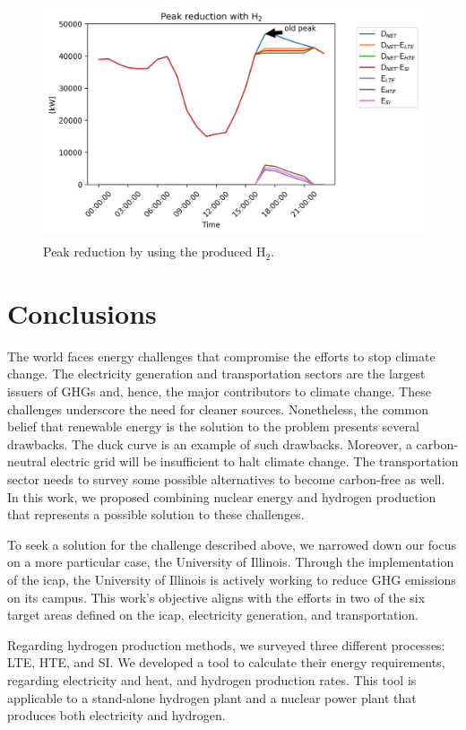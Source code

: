 \begin{figure}[htbp!]
    \centering
	\includegraphics[height=7cm]{figures-hydro/uiuc-hydro3}
	\hfill
	\caption{Peak reduction by using the produced H$_2$.}
	\label{fig:uiuc-duck3}
\end{figure}

\section{Conclusions}

The world faces energy challenges that compromise the efforts to stop climate change.
The electricity generation and transportation sectors are the largest issuers of \glspl{GHG} and, hence, the major contributors to climate change.
These challenges underscore the need for cleaner sources.
Nonetheless, the common belief that renewable energy is the solution to the problem presents several drawbacks.
The duck curve is an example of such drawbacks.
Moreover, a carbon-neutral electric grid will be insufficient to halt climate change.
The transportation sector needs to survey some possible alternatives to become carbon-free as well.
In this work, we proposed combining nuclear energy and hydrogen production that represents a possible solution to these challenges.

To seek a solution for the challenge described above, we narrowed down our focus on a more particular case, the University of Illinois.
Through the implementation of the \gls{icap}, the University of Illinois is actively working to reduce \gls{GHG} emissions on its campus.
This work's objective aligns with the efforts in two of the six target areas defined on the \gls{icap}, electricity generation, and transportation.

Regarding hydrogen production methods, we surveyed three different processes: \gls{LTE}, \gls{HTE}, and \gls{SI}.
We developed a tool to calculate their energy requirements, regarding electricity and heat, and hydrogen production rates.
This tool is applicable to a stand-alone hydrogen plant and a nuclear power plant that produces both electricity and hydrogen.

